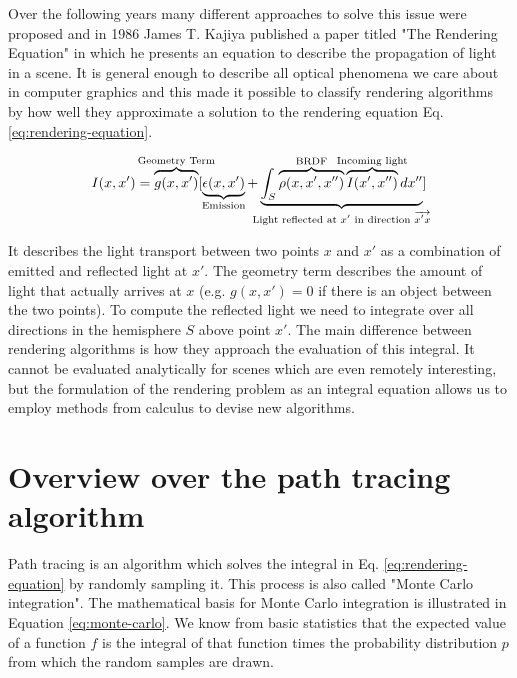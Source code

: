 \documentclass{ACGSeminar}
\begin{document}
Over the following years many different approaches to solve this issue were proposed and in 1986 James T. Kajiya published a paper titled "The Rendering Equation"  \cite{Kajiya:1986} in which he presents an equation to describe the propagation of light in a scene. It is general enough to describe all optical phenomena we care about in computer graphics and this made it possible to classify rendering algorithms by how well they approximate a solution to the rendering equation Eq. \eqref{eq:rendering-equation}.

\begin{equation} \label{eq:rendering-equation}
I(x,x')= \overbrace{g(x,x')}^{\mathclap{\text{Geometry Term}}}
         [
         \underbrace{\epsilon(x,x')}_{\mathclap{\text{Emission}}}
         + \underbrace{
         \int_{S}{\overbrace{\rho(x,x',x'')}^{\mathclap{\text{BRDF}}}
                  \overbrace{I(x',x'') }^{\mathclap{\text{Incoming light}}} dx''}
         }_{\mathclap{\text{Light reflected at $x'$ in direction $\overrightarrow{x'x}$}}} ]
\end{equation}

It describes the light transport between two points $x$ and $x'$ as a combination of emitted and reflected light at $x'$. The geometry term describes the amount of light that actually arrives at $x$ (e.g. $g(x,x') = 0$ if there is an object between the two points). To compute the reflected light we need to integrate over all directions in the hemisphere $S$ above point $x'$. 
The main difference between rendering algorithms is how they approach the evaluation of this integral. It cannot be evaluated analytically for scenes which are even remotely interesting, but the formulation of the rendering problem as an integral equation allows us to employ methods from calculus to devise new algorithms.

\section{Overview over the path tracing algorithm} \label{path-tracing}
Path tracing is an algorithm which solves the integral in Eq. \eqref{eq:rendering-equation} by randomly sampling it. This process is also called "Monte Carlo integration". \cite{veach1997robust} 
The mathematical basis for Monte Carlo integration is illustrated in Equation \eqref{eq:monte-carlo}. We know from basic statistics that the expected value of a function $f$ is the integral of that function times the probability distribution $p$ from which the random samples are drawn.
\end{document}
